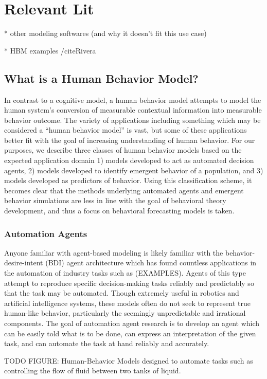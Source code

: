 \section{Relevant Lit}

* other modeling softwares (and why it doesn’t fit this use case)

* HBM examples /cite{Rivera}
\subsection{What is a Human Behavior Model?}
In contrast to a cognitive model, a human behavior model attempts to model the human system’s conversion of measurable contextual information into measurable behavior outcome. 
The variety of applications including something which may be considered a “human behavior model” is vast, but some of these applications better fit with the goal of increasing understanding of human behavior. 
For our purposes, we describe three classes of human behavior models based on the expected application domain 1) models developed to act as automated decision agents, 2) models developed to identify emergent behavior of a population, and 3) models developed as predictors of behavior. 
Using this classification scheme, it becomes clear that the methods underlying automated agents and emergent behavior simulations are less in line with the goal of behavioral theory development, and thus a focus on behavioral forecasting models is taken.
\subsubsection{Automation Agents}
Anyone familiar with agent-based modeling is likely familiar with the behavior-desire-intent (BDI) agent architecture which has found countless applications in the automation of industry tasks such as (EXAMPLES). 
Agents of this type attempt to reproduce specific decision-making tasks reliably and predictably so that the task may be automated. 
Though extremely useful in robotics and artificial intelligence systems, these models often do not seek to represent true human-like behavior, particularly the seemingly unpredictable and irrational components. 
The goal of automation agent research is to develop an agent which can be easily told what is to be done, can express an interpretation of the given task, and can automate the task at hand reliably and accurately.

TODO FIGURE: Human-Behavior Models designed to automate tasks such as controlling the flow of fluid between two tanks of liquid.

